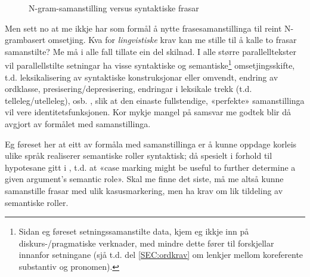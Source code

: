 \documentclass[11pt,a4paper,oneside,draft]{book}
\begin{document}
  \begin{figure}[htp]
    \vfill{} %
   \caption{N-gram-samanstilling versus syntaktiske frasar}
    \label{fig:ikkjenode}
  \end{figure}

Men sett no at me ikkje har som formål å nytte frasesamanstillinga til
reint N-grambasert omsetjing. Kva for \emph{lingvistiske} krav kan me
stille til å kalle to frasar samanstilte? Me må i alle fall tillate
ein del skilnad.  I alle større parallelltekster vil parallellstilte
setningar ha visse syntaktiske og semantiske\footnote{Sidan eg føreset setningssamanstilte data, kjem eg ikkje inn på
 diskurs-/pragmatiske verknader, med mindre dette fører til
 forskjellar innanfor setningane (sjå t.d. del \ref{SEC:ordkrav} om
 lenkjer mellom koreferente substantiv og pronomen). } omsetjingsskifte,
t.d. leksikalisering av syntaktiske konstruksjonar eller omvendt,
endring av ordklasse, presisering/depresisering, endringar i leksikale
trekk (t.d. telleleg/utelleleg),
osb. \citep[s.~56--62]{munday2001its}, slik at den einaste
fullstendige, «perfekte» samanstillinga vil vere
identitetsfunksjonen. Kor mykje mangel på samsvar me godtek blir då
avgjort av formålet med samanstillinga.


Eg føreset her at eitt av formåla med samanstillinga er å kunne
oppdage korleis ulike språk realiserer semantiske roller syntaktisk;
då spesielt i forhold til hypotesane gitt i \citet[s.~7]{xpar2008rcn},
t.d. at «case marking might be useful to further determine a given
argument's semantic role». Skal me finne det siste, må me altså kunne
samanstille frasar med ulik kasusmarkering, men ha krav om lik
tildeling av semantiske roller.
\end{document}
